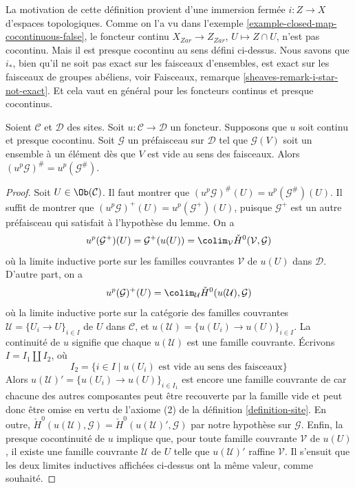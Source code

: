 \noindent
La motivation de cette définition provient d’une immersion fermée
$i : Z \to X$ d’espaces topologiques. Comme on l’a vu dans
l’exemple \ref{example-closed-map-cocontinuous-false},
le foncteur continu
$X_{Zar} \to Z_{Zar}$, $U \mapsto Z \cap U$, n’est
pas cocontinu. Mais il est presque cocontinu au sens défini ci-dessus.
Nous savons que $i_*$, bien qu’il ne soit pas exact sur les faisceaux d’ensembles, est
exact sur les faisceaux de groupes abéliens, voir
Faisceaux, remarque \ref{sheaves-remark-i-star-not-exact}.
Et cela vaut en général pour les foncteurs continus et presque cocontinus.

\begin{lemma}
\label{lemma-almost-cocontinuous-sheafification}
Soient $\mathcal{C}$ et $\mathcal{D}$ des sites.
Soit $u : \mathcal{C} \to \mathcal{D}$ un foncteur.
Supposons que $u$ soit continu et presque cocontinu.
Soit $\mathcal{G}$ un préfaisceau sur $\mathcal{D}$ tel que $\mathcal{G}(V)$ soit
un ensemble à un élément dès que $V$ est vide au sens des faisceaux.
Alors $(u^p\mathcal{G})^\# = u^p(\mathcal{G}^\#)$.
\end{lemma}

\begin{proof}
Soit $U \in \Ob(\mathcal{C})$. Il faut montrer que
$(u^p\mathcal{G})^\#(U) = u^p(\mathcal{G}^\#)(U)$.
Il suffit de montrer que
$(u^p\mathcal{G})^+(U) = u^p(\mathcal{G}^+)(U)$,
puisque $\mathcal{G}^+$ est un autre préfaisceau qui satisfait à
l’hypothèse du lemme. On a
$$
u^p(\mathcal{G}^+)(U) =
\mathcal{G}^+(u(U)) =
\colim_\mathcal{V} \check H^0(\mathcal{V}, \mathcal{G})
$$
où la limite inductive porte sur les familles couvrantes $\mathcal{V}$ de $u(U)$ dans
$\mathcal{D}$. D’autre part, on a
$$
u^p(\mathcal{G})^+(U) =
\colim_\mathcal{U} \check H^0(u(\mathcal{U}), \mathcal{G})
$$
où la limite inductive porte sur la catégorie des familles couvrantes
$\mathcal{U} = \{U_i \to U\}_{i \in I}$ de $U$ dans $\mathcal{C}$, et
$u(\mathcal{U}) = \{u(U_i) \to u(U)\}_{i \in I}$. La continuité
de $u$ signifie que chaque $u(\mathcal{U})$ est une famille couvrante.
Écrivons $I = I_1 \amalg I_2$, où
$$
I_2 = \{i \in I \mid u(U_i)\text{ est vide au sens des faisceaux}\}
$$
Alors $u(\mathcal{U})' = \{u(U_i) \to u(U)\}_{i \in I_1}$ est encore une famille couvrante de
car chacune des autres composantes peut être recouverte par la famille vide
et peut donc être omise en vertu de l’axiome (2) de la
définition \ref{definition-site}.
En outre,
$\check H^0(u(\mathcal{U}), \mathcal{G}) =
\check H^0(u(\mathcal{U})', \mathcal{G})$
par notre hypothèse sur $\mathcal{G}$. Enfin, la presque cocontinuité de $u$
implique que, pour toute famille couvrante $\mathcal{V}$
de $u(U)$, il existe une famille couvrante $\mathcal{U}$ de $U$ telle que
$u(\mathcal{U})'$ raffine $\mathcal{V}$. Il s’ensuit que les deux limites inductives
affichées ci-dessus ont la même valeur, comme souhaité.
\end{proof}


